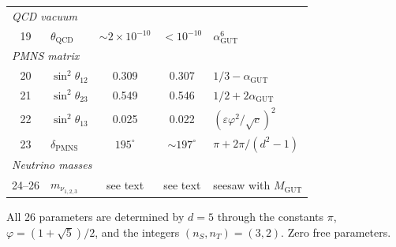 \begin{center}
\begin{tabular}{clccl}
\multicolumn{5}{l}{\emph{QCD vacuum}} \\
19 & $\theta_\text{QCD}$ & $\sim 2\!\times\! 10^{-10}$ & $< 10^{-10}$ & $\alpha_\text{GUT}^6$ \\
\hline
\multicolumn{5}{l}{\emph{PMNS matrix}} \\
20 & $\sin^2\theta_{12}$ & 0.309 & 0.307 & $1/3 - \alpha_\text{GUT}$ \\
21 & $\sin^2\theta_{23}$ & 0.549 & 0.546 & $1/2 + 2\alpha_\text{GUT}$ \\
22 & $\sin^2\theta_{13}$ & 0.025 & 0.022 & $(\varepsilon\varphi^2/\sqrt{c})^2$ \\
23 & $\delta_\text{PMNS}$ & $195^\circ$ & $\sim 197^\circ$ & $\pi + 2\pi/(d^2\!-\!1)$ \\
\hline
\multicolumn{5}{l}{\emph{Neutrino masses}} \\
24--26 & $m_{\nu_{1,2,3}}$ & see text & see text & seesaw with $M_\text{GUT}$ \\
\hline
\end{tabular}
\end{center}

\medskip
\noindent All 26 parameters are determined by $d = 5$ through the constants $\pi$, $\varphi = (1+\sqrt{5})/2$, and the integers $(n_S, n_T) = (3, 2)$. Zero free parameters.
